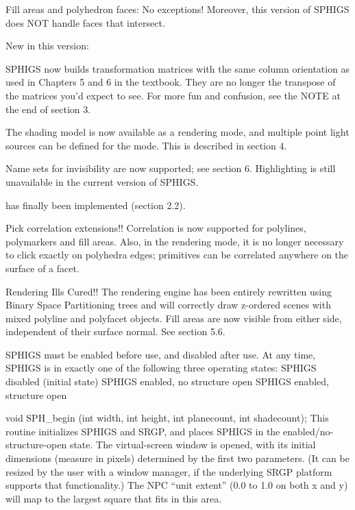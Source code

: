 \bullitem Fill areas and polyhedron faces:  No
exceptions!  Moreover, this version of SPHIGS does NOT handle faces
that intersect.

\newpar
New in this version:

\bullitem SPHIGS now builds transformation matrices with the same column
orientation as used in Chapters 5 and 6 in the textbook.  They are no
longer the transpose of the matrices you'd expect to see.  For more
fun and confusion, see the NOTE at the end of section 3.

\bullitem The  shading model is now available as a rendering mode,
and multiple point light sources can be defined for the
 mode.  This is described in section 4.

\bullitem Name sets for invisibility are now supported; see section 6.
Highlighting is still unavailable in the current version of SPHIGS.

\bullitem {} has finally been implemented (section 2.2).

\bullitem Pick correlation extensions!!  Correlation is now supported for
polylines, polymarkers and fill areas.  Also, in the 
rendering mode, it is no longer necessary to click exactly on
polyhedra edges; primitives can be correlated anywhere on the surface
of a facet.

\bullitem Rendering Ills Cured!!  The rendering engine has been entirely
rewritten using Binary Space Partitioning trees and will correctly
draw z-ordered scenes with mixed polyline and polyfacet objects.  Fill
areas are now visible from either side, independent of their surface
normal.  See section 5.6.


SPHIGS must be enabled before use, and disabled after use.  At any time, SPHIGS
is in exactly one of the following three operating states:
\bullitem SPHIGS disabled (initial state)
\bullitem SPHIGS enabled, no structure open
\bullitem SPHIGS enabled, structure open


\newsynopsis
void SPH_begin (int width, int height, int planecount, int shadecount);
\endsynopsis
This routine initializes SPHIGS and SRGP, and places SPHIGS in the
enabled/no-structure-open state.  The virtual-screen window is opened, with
its initial dimensions (measure in pixels) determined by the first two
parameters.
(It can be resized by the user with a window manager, if the underlying SRGP
platform supports that functionality.)
The NPC ``unit extent'' (0.0 to 1.0 on both x and y) will map to the largest
square that fits in this area.


